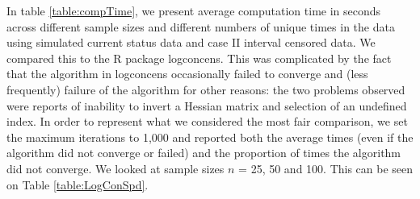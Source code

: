 	In table \ref{table:compTime}, we present average computation time in seconds across different sample sizes and different numbers of unique times in the data using simulated current status data and case II interval censored data. We compared this to the R package logconcens. This was complicated by the fact  that the algorithm in logconcens occasionally failed to converge and (less frequently) failure of the algorithm for other reasons: the two problems observed were reports of inability to invert a Hessian matrix and selection of an undefined index. In order to represent what we considered the most fair comparison, we set the maximum iterations to 1,000 and reported both the average times (even if the algorithm did not converge or failed) and the proportion of times the algorithm did not converge. We looked at sample sizes $n$ = 25, 50 and 100. This can be seen on Table \ref{table:LogConSpd}. 
	
